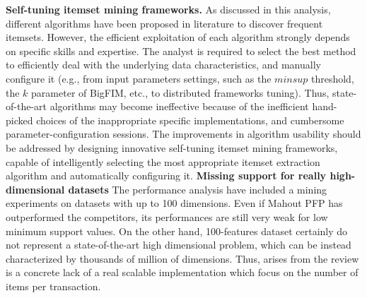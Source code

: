 \textbf{Self-tuning itemset mining frameworks.} 
As discussed in this analysis, different algorithms have been proposed in literature
to discover frequent itemsets. 
However, the efficient exploitation of each algorithm strongly depends on specific skills and expertise. 
The analyst is required to select the best method to efficiently deal with the
underlying data characteristics, 
and manually configure it 
(e.g., from input parameters settings, such as the $minsup$ threshold, the $k$ parameter of BigFIM, etc., to distributed frameworks tuning).
Thus, state-of-the-art algorithms may become ineffective because of the inefficient hand-picked choices 
of the inappropriate specific implementations, and cumbersome parameter-configuration sessions.
The improvements in algorithm usability should be addressed by designing innovative self-tuning itemset mining 
frameworks, capable of intelligently selecting the most appropriate itemset extraction algorithm 
and automatically configuring it.
\textbf{Missing support for really high-dimensional datasets}
The performance analysis have included a mining experiments on datasets with 
up to 100 dimensions. Even if Mahout PFP has outperformed the competitors, its performances
are still very weak for low minimum support values. On the other hand, 100-features dataset certainly
do not represent a state-of-the-art high dimensional problem, which can be instead characterized by thousands of million of dimensions.
Thus, arises from the review is a concrete lack of a real scalable implementation which focus on the number of
items per transaction. 




